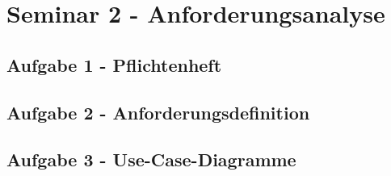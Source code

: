 
\section{Seminar 2 - Anforderungsanalyse}

	\subsection{Aufgabe 1 - Pflichtenheft}
	
	\subsection{Aufgabe 2 - Anforderungsdefinition}
	
	\subsection{Aufgabe 3 - Use-Case-Diagramme}
	
